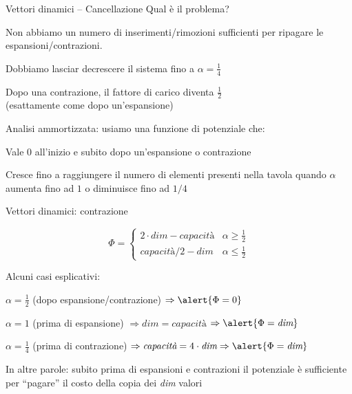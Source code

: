 \begin{frame}{Vettori dinamici -- Cancellazione}
Qual è il problema?
\BI
\item Non abbiamo un numero di inserimenti/rimozioni sufficienti per ripagare le espansioni/contrazioni.
\EI

\bigskip
Dobbiamo lasciar decrescere il sistema fino a $\alpha = \frac{1}{4}$
\BI
\item Dopo una contrazione, il fattore di carico diventa $\frac{1}{2}$\\
(esattamente come dopo un'espansione)
\EI

\bigskip
\alert{Analisi ammortizzata}: usiamo una funzione di potenziale che:
\BI
\item Vale $0$ all’inizio e subito dopo un'espansione o contrazione
\item Cresce fino a raggiungere il numero di elementi presenti nella tavola quando $\alpha$ aumenta fino ad $1$ o diminuisce fino ad $1/4$
\EI
\end{frame}

\begin{frame}{Vettori dinamici: contrazione}

\vspace{-9pt}
\begin{myboxtitle}
\[
\Phi = \begin{cases}	
2 \cdot \textit{dim} - \textit{capacità} & \alpha \geq \frac{1}{2}\\
\textit{capacità} / 2 - \textit{dim}  & \alpha \leq \frac{1}{2}
\end{cases}
\]
\end{myboxtitle}

\bigskip
Alcuni casi esplicativi:
\BI
\item $\alpha = \frac{1}{2}$ (dopo espansione/contrazione) $\Rightarrow \alert{\Phi = 0}$
\item $\alpha = 1$ (prima di espansione) $\Rightarrow \textit{dim}=\textit{capacità}$ $\Rightarrow \alert{\Phi = \textit{dim}}$
\item $\alpha = \frac{1}{4}$ (prima di contrazione) $\Rightarrow \textit{capacità} = 4 \cdot \textit{dim} \Rightarrow \alert{\Phi = \textit{dim}}$
\EI

\bigskip
In altre parole: subito prima di espansioni e contrazioni il potenziale è sufficiente per “pagare” il costo della copia dei \textit{dim} valori

\end{frame}

